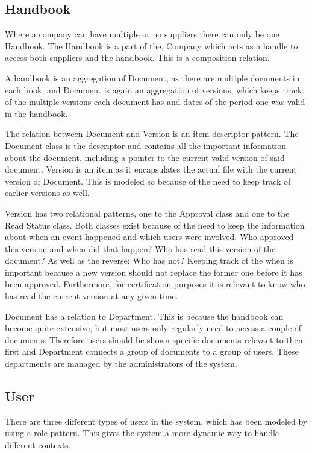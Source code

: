 \subsection{Handbook}
Where a company can have multiple or no suppliers there can only be one Handbook.
The Handbook is a part of the, Company which acts as a handle to access both suppliers and the handbook. This is a composition relation.

A handbook is an aggregation of Document, as there are multiple documents in each book, and Document is again an aggregation of versions, which keeps track of the multiple versions each document has and dates of the period one was valid in the handbook.

The relation between Document and Version is an item-descriptor pattern.
The Document class is the descriptor and contains all the important information about the document, including a pointer to the current valid version of said document.
Version is an item as it encapsulates the actual file with the current version of Document.
This is modeled so because of the need to keep track of earlier versions as well.

Version has two relational patterns, one to the Approval class and one to the Read Status class.
Both classes exist because of the need to keep the information about when an event happened and which users were involved.
Who approved this version and when did that happen?
Who has read this version of the document?
As well as the reverse: Who has not?
Keeping track of the when is important because a new version should not replace the former one before it has been approved.
Furthermore, for certification purposes it is relevant to know who has read the current version at any given time.

Document has a relation to Department.
This is because the handbook can become quite extensive, but most users only regularly need to access a couple of documents.
Therefore users should be shown specific documents relevant to them first and Department connects a group of documents to a group of users.
These departments are managed by the administrators of the system.

\subsection{User}
There are three different types of users in the system, which has been modeled by using a role pattern. This gives the system a more dynamic way to handle different contexts.

